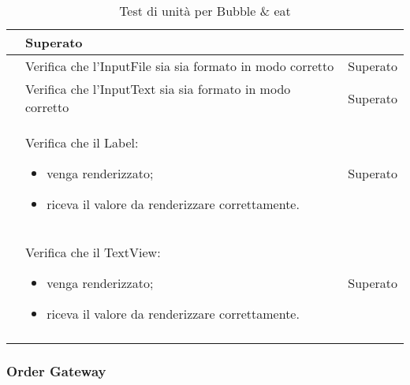 \begin{longtable}{|c|P{9cm}|c|}
	& Superato \\
	\hline {} & Verifica che l'InputFile sia sia formato in modo corretto & Superato \\
	\hline {} & Verifica che l'InputText sia sia formato in modo corretto & Superato \\
	\hline {} & Verifica che il Label:
	\begin{itemize}
		\item venga renderizzato;
		\item riceva il valore da renderizzare correttamente.
	\end{itemize}
	& Superato \\
	\hline {} & Verifica che il TextView:
	\begin{itemize}
		\item venga renderizzato;
		\item riceva il valore da renderizzare correttamente.
	\end{itemize}
	& Superato \\
	\hline
	\caption{Test di unità per Bubble \& eat}
\end{longtable}

\subsubsection{Order Gateway}

